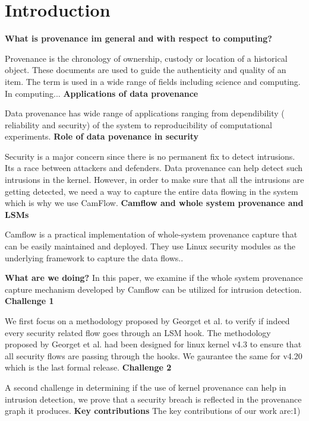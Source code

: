 \section{Introduction}
\textbf{What is provenance im general and with respect to computing?}

Provenance is the chronology of ownership, custody or location of a historical object. These documents are used to guide the authenticity and quality of an item. The term is used in a wide range of fields including science and computing. In computing...
\vskip 0.1in
\textbf{Applications of data provenance}

Data provenance has wide range of applications ranging from dependibility ( reliability and security) of the system to reproducibility of computational experiments.
\vskip 0.1in
\textbf{Role of data povenance in security}

Security is a major concern since there is no permanent fix to detect intrusions. Its a race between attackers and defenders. Data provenance can help detect such intrusions in the kernel. However, in order to make sure that all the intrusions are getting detected, we need a way to capture the entire data flowing in the system which is why we use CamFlow. 
\vskip 0.1in
\textbf{Camflow and whole system provenance and LSMs}

Camflow is a practical implementation of whole-system provenance capture that can be easily maintained and deployed. They use Linux security modules as the underlying framework to capture the data flows.. 


\textbf{What are we doing?}
In this paper, we examine if the whole system provenance capture mechanism developed by Camflow can be utilized for intrusion detection. 
\vskip 0.1in
\textbf{Challenge 1}

We first focus on a methodology proposed by Georget et al. to verify if indeed every security related flow goes through an LSM hook. The methodology proposed by Georget et al. had been designed for linux kernel v4.3 to ensure that all security flows are passing through the hooks. We gaurantee the same for v4.20 which is the last formal release. 
\vskip 0.1in
\textbf{Challenge 2}

A second challenge in determining if the use of kernel provenance can help in intrusion detection, we prove that a security breach is reflected in the provenance graph it produces. 
\vskip 0.1in
\textbf{Key contributions}
The key contributions of our work are:1)
